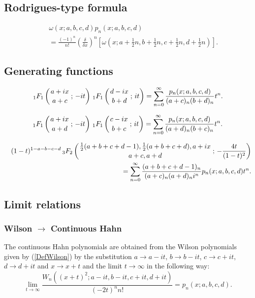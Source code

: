 \documentclass[envcountchap,graybox]{svmono}
\newcounter{rom}
\newcommand{\hyp}[5]{\mbox{}_{#1}{F}_{#2}
\left(\genfrac{}{}{0pt}{}{#3}{#4}\,;\,#5\right)}
\begin{document}
\subsection*{Rodrigues-type formula}
\begin{eqnarray}
\label{RodContHahn}
& &\omega(x;a,b,c,d)p_n(x;a,b,c,d)\nonumber\\
& &{}=\frac{(-1)^n}{n!}\left(\frac{\delta}{\delta x}\right)^n
\left[\omega(x;a+\textstyle\frac{1}{2}n,b+\textstyle\frac{1}{2}n,
c+\textstyle\frac{1}{2}n,d+\textstyle\frac{1}{2}n)\right].
\end{eqnarray}

\subsection*{Generating functions}
\begin{equation}
\label{GenContHahn1}
\hyp{1}{1}{a+ix}{a+c}{-it}\,\hyp{1}{1}{d-ix}{b+d}{it}=
\sum_{n=0}^{\infty}\frac{p_n(x;a,b,c,d)}{(a+c)_n(b+d)_n}t^n.
\end{equation}

\begin{equation}
\label{GenContHahn2}
\hyp{1}{1}{a+ix}{a+d}{-it}\,\hyp{1}{1}{c-ix}{b+c}{it}=
\sum_{n=0}^{\infty}\frac{p_n(x;a,b,c,d)}{(a+d)_n(b+c)_n}t^n.
\end{equation}

\begin{eqnarray}
\label{GenContHahn3}
& &(1-t)^{1-a-b-c-d}\,\hyp{3}{2}{\frac{1}{2}(a+b+c+d-1),\frac{1}{2}(a+b+c+d),a+ix}
{a+c,a+d}{-\frac{4t}{(1-t)^2}}\nonumber\\
& &{}=\sum_{n=0}^{\infty}
\frac{(a+b+c+d-1)_n}{(a+c)_n(a+d)_ni^n}p_n(x;a,b,c,d)t^n.
\end{eqnarray}

\subsection*{Limit relations}

\subsubsection*{Wilson $\rightarrow$ Continuous Hahn}
The continuous Hahn polynomials are obtained from the Wilson polynomials given by
(\ref{DefWilson}) by the substitution $a\rightarrow a-it$, $b\rightarrow b-it$,
$c\rightarrow c+it$, $d\rightarrow d+it$ and $x\rightarrow x+t$ and the limit
$t\rightarrow\infty$ in the following way:
$$\lim_{t\rightarrow\infty}
\frac{W_n((x+t)^2;a-it,b-it,c+it,d+it)}{(-2t)^nn!}=p_n(x;a,b,c,d).$$
\end{document}
